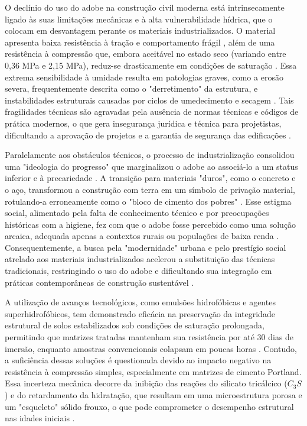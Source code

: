     O declínio do uso do adobe na construção civil moderna está intrinsecamente ligado às suas limitações mecânicas e à alta vulnerabilidade hídrica, que o colocam em desvantagem perante os materiais industrializados. O material apresenta baixa resistência à tração e comportamento frágil \cite{Brito2023, Fages2022}, além de uma resistência à compressão que, embora aceitável no estado seco (variando entre 0,36 MPa e 2,15 MPa), reduz-se drasticamente em condições de saturação \cite{Kafodya2019, Khunaprapakorn2025, Dao2018}. Essa extrema sensibilidade à umidade resulta em patologias graves, como a erosão severa, frequentemente descrita como o "derretimento" da estrutura, e instabilidades estruturais causadas por ciclos de umedecimento e secagem \cite{Day1993, Sharma2016}. Tais fragilidades técnicas são agravadas pela ausência de normas técnicas e códigos de prática modernos, o que gera insegurança jurídica e técnica para projetistas, dificultando a aprovação de projetos e a garantia de segurança das edificações \cite{Fages2022, Martins2018, Morel2021, Victor2025}.

    Paralelamente aos obstáculos técnicos, o processo de industrialização consolidou uma "ideologia do progresso" que marginalizou o adobe ao associá-lo a um status inferior e à precariedade \cite{Aspillaga2024, Morel2021, Novato2019}. A transição para materiais "duros", como o concreto e o aço, transformou a construção com terra em um símbolo de privação material, rotulando-a erroneamente como o "bloco de cimento dos pobres" \cite{Zoungrana2021}. Esse estigma social, alimentado pela falta de conhecimento técnico e por preocupações históricas com a higiene, fez com que o adobe fosse percebido como uma solução arcaica, adequada apenas a contextos rurais ou populações de baixa renda \cite{Soler2021, Novato2019, Morel2021, Aspillaga2024}. Consequentemente, a busca pela "modernidade" urbana e pelo prestígio social atrelado aos materiais industrializados acelerou a substituição das técnicas tradicionais, restringindo o uso do adobe e dificultando sua integração em práticas contemporâneas de construção sustentável \cite{Zoungrana2021}.


    A utilização de avanços tecnológicos, como emulsões hidrofóbicas e agentes superhidrofóbicos, tem demonstrado eficácia na preservação da integridade estrutural de solos estabilizados sob condições de saturação prolongada, permitindo que matrizes tratadas mantenham sua resistência por até 30 dias de imersão, enquanto amostras convencionais colapsam em poucas horas \cite{Guo2025}. Contudo, a suficiência dessas soluções é questionada devido ao impacto negativo na resistência à compressão simples, especialmente em matrizes de cimento Portland. Essa incerteza mecânica decorre da inibição das reações do silicato tricálcico ($C_3S$) e do retardamento da hidratação, que resultam em uma microestrutura porosa e um "esqueleto" sólido frouxo, o que pode comprometer o desempenho estrutural nas idades iniciais \cite{Lu2023, Luo2023, Jahandari2023}.

